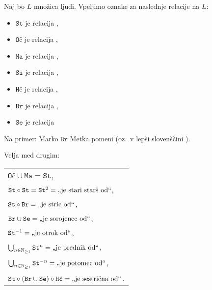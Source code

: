                 \begin{zgled}
                        Naj bo $L$ množica ljudi. Vpeljimo oznake za naslednje relacije na $L$:
                        \begin{itemize}
                                \item
                                        $\texttt{St}$ je relacija ,
                                \item
                                        $\texttt{Oč}$ je relacija ,
                                \item
                                        $\texttt{Ma}$ je relacija ,
                                \item
                                        $\texttt{Si}$ je relacija ,
                                \item
                                        $\texttt{Hč}$ je relacija ,
                                \item
                                        $\texttt{Br}$ je relacija ,
                                \item
                                        $\texttt{Se}$ je relacija 
                        \end{itemize}

                        Na primer: Marko $\texttt{Br}$ Metka pomeni  (oz.~v lepši slovenščini ).

                        Velja med drugim:

                        \begin{tabular}{l}
                                $\texttt{Oč} \cup \texttt{Ma} = \texttt{St}$, \\
                                $\texttt{St} \circ \texttt{St} = \texttt{St}^2 = \text{\qt{je stari starš od}}$, \\
                                $\texttt{St} \circ \texttt{Br} = \text{\qt{je stric od}}$, \\
                                $\texttt{Br} \cup \texttt{Se} = \text{\qt{je sorojenec od}}$, \\
                                $\texttt{St}^{-1} = \text{\qt{je otrok od}}$, \\
                                $\bigcup_{n \in \NN_{\geq 1}} \texttt{St}^n = \text{\qt{je prednik od}}$, \\
                                $\bigcup_{n \in \NN_{\geq 1}} \texttt{St}^{-n} = \text{\qt{je potomec od}}$, \\
                                $\texttt{St} \circ (\texttt{Br} \cup \texttt{Se}) \circ \texttt{Hč} = \text{\qt{je sestrična od}}$.
                        \end{tabular}


\end{zgled}
